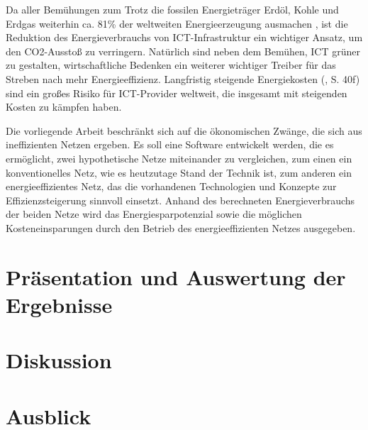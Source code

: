 \documentclass[12pt,titlepage]{article}
\begin{document}
Da aller Bemühungen zum Trotz die fossilen Energieträger Erdöl, Kohle und Erdgas weiterhin ca. 81\% der weltweiten Energieerzeugung ausmachen \cite{statista}, ist die Reduktion des Energieverbrauchs von ICT-Infrastruktur ein wichtiger Ansatz, um den CO2-Ausstoß zu verringern. Natürlich sind neben dem Bemühen, ICT grüner zu gestalten, wirtschaftliche Bedenken ein weiterer wichtiger Treiber für das Streben nach mehr Energieeffizienz. Langfristig steigende Energiekosten (\cite{iea2015}, S. 40f) sind ein großes Risiko für ICT-Provider weltweit, die insgesamt mit steigenden Kosten zu kämpfen haben.

Die vorliegende Arbeit beschränkt sich auf die ökonomischen Zwänge, die sich aus ineffizienten Netzen ergeben. Es soll eine Software entwickelt werden, die es ermöglicht, zwei hypothetische Netze miteinander zu vergleichen, zum einen ein konventionelles Netz, wie es heutzutage Stand der Technik ist, zum anderen ein energieeffizientes Netz, das die vorhandenen Technologien und Konzepte zur Effizienzsteigerung sinnvoll einsetzt. Anhand des berechneten Energieverbrauchs der beiden Netze wird das Energiesparpotenzial sowie die möglichen Kosteneinsparungen durch den Betrieb des energieeffizienten Netzes ausgegeben.


\section{Präsentation und Auswertung der Ergebnisse}

\section{Diskussion}

\section{Ausblick}

\newpage
\printbibliography 
\end{document}
